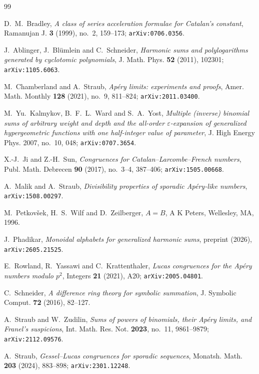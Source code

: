 \documentclass[11pt]{article}
\theoremstyle{definition}
\theoremstyle{remark}
\begin{document}
\begin{thebibliography}{99}

D.~M.~Bradley,
\emph{A class of series acceleration formulae for Catalan's constant},
Ramanujan J. \textbf{3} (1999), no.~2, 159--173;
\texttt{arXiv:0706.0356}.

J.~Ablinger, J.~Bl\"umlein and C.~Schneider,
\emph{Harmonic sums and polylogarithms generated by cyclotomic polynomials},
J. Math. Phys. \textbf{52} (2011), 102301; \texttt{arXiv:1105.6063}.

M.~Chamberland and A.~Straub,
\emph{Ap\'ery limits: experiments and proofs},
Amer. Math. Monthly \textbf{128} (2021), no.~9, 811--824;
\texttt{arXiv:2011.03400}.

M.~Yu.~Kalmykov, B.~F.~L.~Ward and S.~A.~Yost,
\emph{Multiple (inverse) binomial sums of arbitrary weight and depth and the all-order
$\varepsilon$-expansion of generalized hypergeometric functions with one half-integer
value of parameter},
J. High Energy Phys. 2007, no.~10, 048; \texttt{arXiv:0707.3654}.

X.-J.~Ji and Z.-H.~Sun,
\emph{Congruences for Catalan--Larcombe--French numbers},
Publ. Math. Debrecen \textbf{90} (2017), no.~3--4, 387--406;
\texttt{arXiv:1505.00668}.

A.~Malik and A.~Straub,
\emph{Divisibility properties of sporadic Ap\'ery-like numbers},
\texttt{arXiv:1508.00297}.

M.~Petkov\v{s}ek, H.~S.~Wilf and D.~Zeilberger,
\emph{$A=B$}, A K Peters, Wellesley, MA, 1996.

J.~Phadikar,
\emph{Monoidal alphabets for generalized harmonic sums},
preprint (2026), \texttt{arXiv:2605.21525}.

E.~Rowland, R.~Yassawi and C.~Krattenthaler,
\emph{Lucas congruences for the Ap\'ery numbers modulo $p^2$},
Integers \textbf{21} (2021), A20; \texttt{arXiv:2005.04801}.

C.~Schneider,
\emph{A difference ring theory for symbolic summation},
J. Symbolic Comput. \textbf{72} (2016), 82--127.

A.~Straub and W.~Zudilin,
\emph{Sums of powers of binomials, their Ap\'ery limits, and Franel's suspicions},
Int. Math. Res. Not. \textbf{2023}, no.~11, 9861--9879;
\texttt{arXiv:2112.09576}.

A.~Straub,
\emph{Gessel--Lucas congruences for sporadic sequences},
Monatsh. Math. \textbf{203} (2024), 883--898;
\texttt{arXiv:2301.12248}.


\end{thebibliography}
\end{document}
